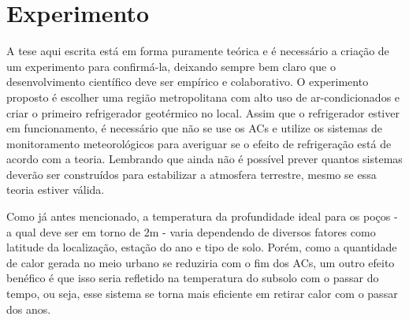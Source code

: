 \section{Experimento}

A tese aqui escrita está em forma puramente teórica e é necessário a criação de um experimento para confirmá-la, deixando sempre bem claro que o desenvolvimento científico deve ser empírico e colaborativo. O experimento proposto é escolher uma região metropolitana com alto uso de ar-condicionados e criar o primeiro refrigerador geotérmico no local. Assim que o refrigerador estiver em funcionamento, é necessário que não se use os ACs e utilize os sistemas de monitoramento meteorológicos para averiguar se o efeito de refrigeração está de acordo com a teoria. Lembrando que ainda não é possível prever quantos sistemas deverão ser construídos para estabilizar a atmosfera terrestre, mesmo se essa teoria estiver válida.

Como já antes mencionado, a temperatura da profundidade ideal para os poços - a qual deve ser em torno de 2m - varia dependendo de diversos fatores como latitude da localização, estação do ano e tipo de solo. Porém, como a quantidade de calor gerada no meio urbano se reduziria com o fim dos ACs, um outro efeito benéfico é que isso seria refletido na temperatura do subsolo com o passar do tempo, ou seja, esse sistema se torna mais eficiente em retirar calor com o passar dos anos.